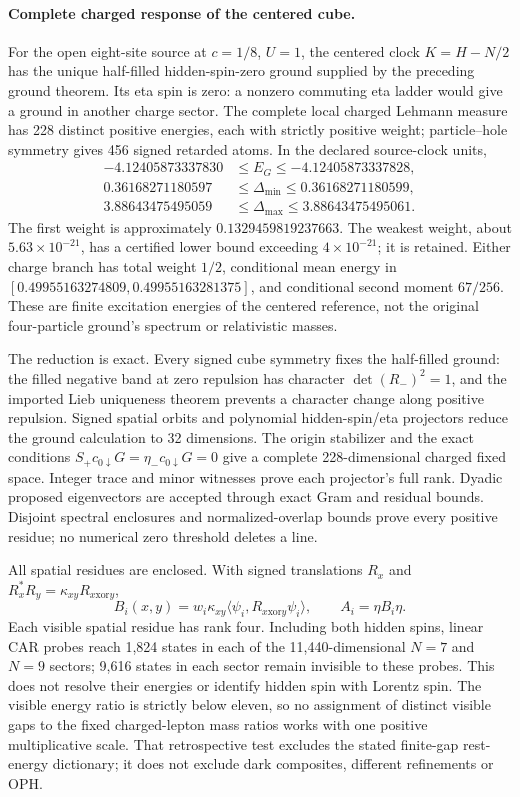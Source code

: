 \paragraph{Complete charged response of the centered cube.}
For the open eight-site source at $c=1/8$, $U=1$, the centered clock
$K=H-N/2$ has the unique half-filled hidden-spin-zero ground supplied by
the preceding ground theorem. Its eta spin is zero: a nonzero commuting
eta ladder would give a ground in another charge sector. The complete
local charged Lehmann measure has 228 distinct positive energies, each
with strictly positive weight; particle--hole symmetry gives 456 signed
retarded atoms. In the declared source-clock units,
\[
\begin{split}
 -4.12405873337830&\leq E_G\leq-4.12405873337828,\\
 0.36168271180597&\leq\Delta_{\min}\leq0.36168271180599,\\
 3.88643475495059&\leq\Delta_{\max}\leq3.88643475495061.
\end{split}
\]
The first weight is approximately $0.1329459819237663$. The weakest
weight, about $5.63\times10^{-21}$, has a certified lower bound exceeding
$4\times10^{-21}$; it is retained. Either charge branch has total weight
$1/2$, conditional mean energy in
$[0.49955163274809,0.49955163281375]$, and conditional second moment
$67/256$. These are finite excitation energies of the centered reference,
not the original four-particle ground's spectrum or relativistic masses.

The reduction is exact. Every signed cube symmetry fixes the half-filled
ground: the filled negative band at zero repulsion has character
$\det(R_-)^2=1$, and the imported Lieb uniqueness theorem prevents a
character change along positive repulsion. Signed spatial orbits and
polynomial hidden-spin/eta projectors reduce the ground calculation to
32 dimensions. The origin stabilizer and the exact conditions
$S_+c_{0\downarrow}G=\eta_-c_{0\downarrow}G=0$ give a complete
228-dimensional charged fixed space. Integer trace and minor witnesses
prove each projector's full rank. Dyadic proposed eigenvectors are
accepted through exact Gram and residual bounds. Disjoint spectral
enclosures and normalized-overlap bounds prove every positive residue;
no numerical zero threshold deletes a line.

All spatial residues are enclosed. With signed translations $R_x$ and
$R_x^*R_y=\kappa_{xy}R_{x\mathbin{\mathrm{xor}}y}$,
\[
 B_i(x,y)=w_i\kappa_{xy}
 \langle\psi_i,R_{x\mathbin{\mathrm{xor}}y}\psi_i\rangle,
 \qquad A_i=\eta B_i\eta .
\]
Each visible spatial residue has rank four. Including both hidden spins,
linear CAR probes reach 1,824 states in each of the 11,440-dimensional
$N=7$ and $N=9$ sectors; 9,616 states in each sector remain invisible to
these probes. This does not resolve their energies or identify hidden
spin with Lorentz spin. The visible energy ratio is strictly below eleven,
so no assignment of distinct visible gaps to the fixed charged-lepton
mass ratios works with one positive multiplicative scale. That
retrospective test excludes the stated finite-gap rest-energy dictionary;
it does not exclude dark composites, different refinements or OPH.
